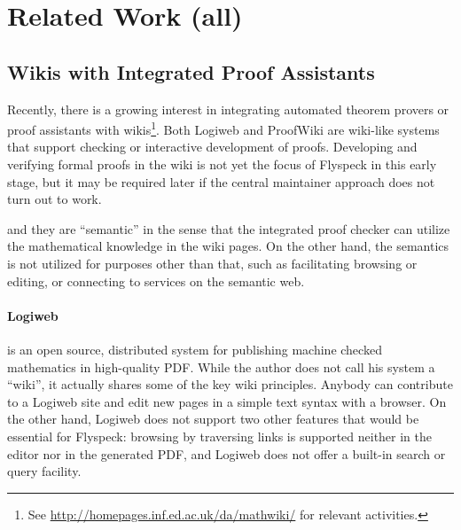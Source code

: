\documentclass{llncs}
\begin{document}



\section{Related Work (all)}
\label{sec:related}


\subsection{Wikis with Integrated Proof Assistants}
\label{sec:wiki-pa}

Recently, there is a growing interest in integrating automated theorem provers or proof
assistants with wikis\footnote{See \url{http://homepages.inf.ed.ac.uk/da/mathwiki/} for
  relevant activities.}.  Both Logiweb and ProofWiki are wiki-like systems that support
checking or interactive development of proofs.  Developing and verifying formal proofs in
the wiki is not yet the focus of Flyspeck in this early stage, but it may be required
later if the central maintainer approach does not turn out to work.

and they are ``semantic'' in the sense that the integrated proof checker can utilize the
mathematical knowledge in the wiki pages.  On the other hand, the semantics is not
utilized for purposes other than that, such as facilitating browsing or editing, or
connecting to services on the semantic web.

\paragraph{Logiweb~\cite{Grue:Logiweb07}} is an open source, distributed system for
publishing machine checked mathematics in high-quality PDF.  While the author does not
call his system a ``wiki'', it actually shares some of the key wiki principles.  Anybody
can contribute to a Logiweb site and edit new pages in a simple text syntax with a
browser.  On the other hand, Logiweb does not support two other features that would be
essential for Flyspeck: browsing by traversing links is supported neither in the editor
nor in the generated PDF, and Logiweb does not offer a built-in search or query facility.
\end{document}
